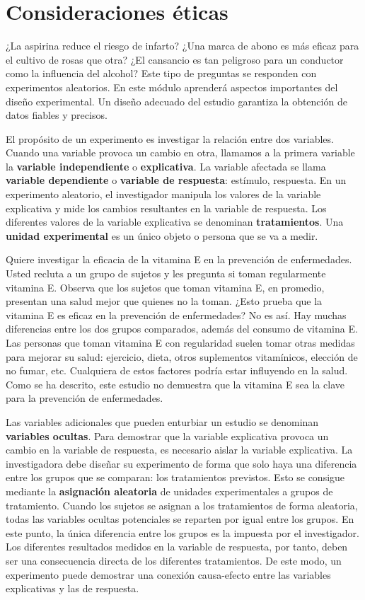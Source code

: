 \documentclass[
  letterpaper,
]{scrbook}
\begin{document}
\hypertarget{consideraciones-uxe9ticas}{%
\section{Consideraciones éticas}\label{consideraciones-uxe9ticas}}

¿La aspirina reduce el riesgo de infarto? ¿Una marca de abono es más
eficaz para el cultivo de rosas que otra? ¿El cansancio es tan peligroso
para un conductor como la influencia del alcohol? Este tipo de preguntas
se responden con experimentos aleatorios. En este módulo aprenderá
aspectos importantes del diseño experimental. Un diseño adecuado del
estudio garantiza la obtención de datos fiables y precisos.

El propósito de un experimento es investigar la relación entre dos
variables. Cuando una variable provoca un cambio en otra, llamamos a la
primera variable la \textbf{variable independiente} o
\textbf{explicativa}. La variable afectada se llama \textbf{variable
dependiente} o \textbf{variable de respuesta}: estímulo, respuesta. En
un experimento aleatorio, el investigador manipula los valores de la
variable explicativa y mide los cambios resultantes en la variable de
respuesta. Los diferentes valores de la variable explicativa se
denominan \textbf{tratamientos}. Una \textbf{unidad experimental} es un
único objeto o persona que se va a medir.

Quiere investigar la eficacia de la vitamina E en la prevención de
enfermedades. Usted recluta a un grupo de sujetos y les pregunta si
toman regularmente vitamina E. Observa que los sujetos que toman
vitamina E, en promedio, presentan una salud mejor que quienes no la
toman. ¿Esto prueba que la vitamina E es eficaz en la prevención de
enfermedades? No es así. Hay muchas diferencias entre los dos grupos
comparados, además del consumo de vitamina E. Las personas que toman
vitamina E con regularidad suelen tomar otras medidas para mejorar su
salud: ejercicio, dieta, otros suplementos vitamínicos, elección de no
fumar, etc. Cualquiera de estos factores podría estar influyendo en la
salud. Como se ha descrito, este estudio no demuestra que la vitamina E
sea la clave para la prevención de enfermedades.

Las variables adicionales que pueden enturbiar un estudio se denominan
\textbf{variables ocultas}. Para demostrar que la variable explicativa
provoca un cambio en la variable de respuesta, es necesario aislar la
variable explicativa. La investigadora debe diseñar su experimento de
forma que solo haya una diferencia entre los grupos que se comparan: los
tratamientos previstos. Esto se consigue mediante la \textbf{asignación
aleatoria} de unidades experimentales a grupos de tratamiento. Cuando
los sujetos se asignan a los tratamientos de forma aleatoria, todas las
variables ocultas potenciales se reparten por igual entre los grupos. En
este punto, la única diferencia entre los grupos es la impuesta por el
investigador. Los diferentes resultados medidos en la variable de
respuesta, por tanto, deben ser una consecuencia directa de los
diferentes tratamientos. De este modo, un experimento puede demostrar
una conexión causa-efecto entre las variables explicativas y las de
respuesta.
\end{document}
